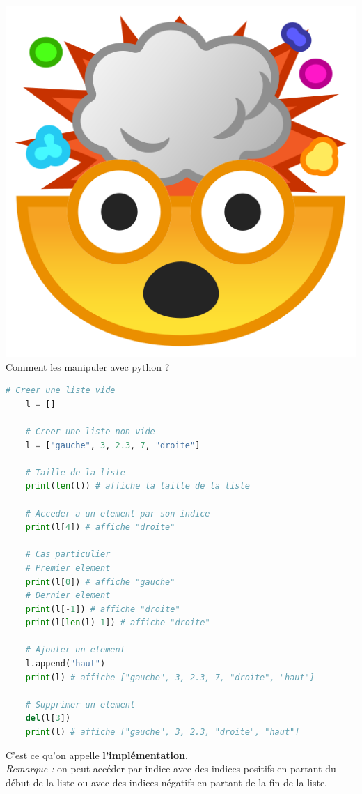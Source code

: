\documentclass{report}
\begin{document}
\includegraphics[scale=0.03]{mindblow}{\selectfont
Comment les manipuler avec python ?\\
}
\begin{lstlisting}[language=Python]
    # Creer une liste vide 
    l = []

    # Creer une liste non vide
    l = ["gauche", 3, 2.3, 7, "droite"]

    # Taille de la liste
    print(len(l)) # affiche la taille de la liste

    # Acceder a un element par son indice
    print(l[4]) # affiche "droite"

    # Cas particulier
    # Premier element
    print(l[0]) # affiche "gauche"
    # Dernier element 
    print(l[-1]) # affiche "droite"
    print(l[len(l)-1]) # affiche "droite"

    # Ajouter un element
    l.append("haut")
    print(l) # affiche ["gauche", 3, 2.3, 7, "droite", "haut"]

    # Supprimer un element
    del(l[3])
    print(l) # affiche ["gauche", 3, 2.3, "droite", "haut"]
\end{lstlisting}

C'est ce qu'on appelle \textbf{l'implémentation}.\\

\textit{Remarque :} on peut accéder par indice avec des indices positifs en partant du début de la liste ou avec des indices négatifs en partant de la fin de la liste.
\end{document}
